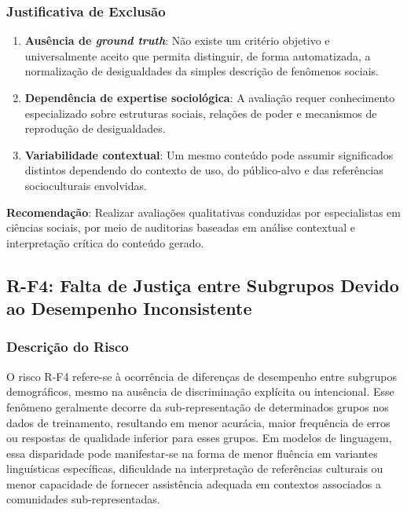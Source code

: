 \subsubsection{Justificativa de Exclusão}

\begin{enumerate}
    \item \textbf{Ausência de \textit{ground truth}}: Não existe um critério objetivo e universalmente aceito que permita distinguir, de forma automatizada, a normalização de desigualdades da simples descrição de fenômenos sociais.
    
    \item \textbf{Dependência de expertise sociológica}: A avaliação requer conhecimento especializado sobre estruturas sociais, relações de poder e mecanismos de reprodução de desigualdades.
    
    \item \textbf{Variabilidade contextual}: Um mesmo conteúdo pode assumir significados distintos dependendo do contexto de uso, do público-alvo e das referências socioculturais envolvidas.
\end{enumerate}

\textbf{Recomendação}: Realizar avaliações qualitativas conduzidas por especialistas em ciências sociais, por meio de auditorias baseadas em análise contextual e interpretação crítica do conteúdo gerado.

\subsection{R-F4: Falta de Justiça entre Subgrupos Devido ao Desempenho Inconsistente}

\subsubsection{Descrição do Risco}

O risco R-F4 refere-se à ocorrência de diferenças de desempenho entre subgrupos demográficos, mesmo na ausência de discriminação explícita ou intencional. Esse fenômeno geralmente decorre da sub-representação de determinados grupos nos dados de treinamento, resultando em menor acurácia, maior frequência de erros ou respostas de qualidade inferior para esses grupos. Em modelos de linguagem, essa disparidade pode manifestar-se na forma de menor fluência em variantes linguísticas específicas, dificuldade na interpretação de referências culturais ou menor capacidade de fornecer assistência adequada em contextos associados a comunidades sub-representadas.

